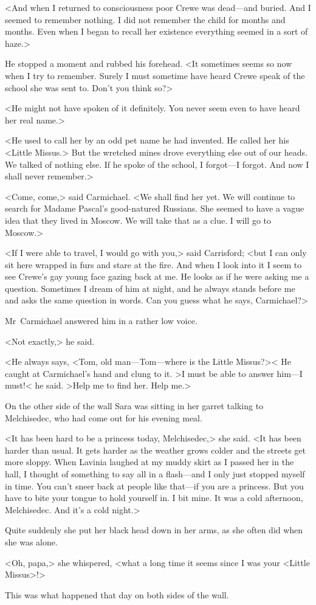 <And when I returned to consciousness poor Crewe was dead—and buried. And I seemed to remember nothing. I did not remember the child for months and months. Even when I began to recall her existence everything seemed in a sort of haze.>

He stopped a moment and rubbed his forehead. <It sometimes seems so now when I try to remember. Surely I must sometime have heard Crewe speak of the school she was sent to. Don't you think so?>

<He might not have spoken of it definitely. You never seem even to have heard her real name.>

<He used to call her by an odd pet name he had invented. He called her his <Little Missus.> But the wretched mines drove everything else out of our heads. We talked of nothing else. If he spoke of the school, I forgot—I forgot. And now I shall never remember.>

<Come, come,> said Carmichael. <We shall find her yet. We will continue to search for Madame Pascal's good-natured Russians. She seemed to have a vague idea that they lived in Moscow. We will take that as a clue. I will go to Moscow.>

<If I were able to travel, I would go with you,> said Carrisford; <but I can only sit here wrapped in furs and stare at the fire. And when I look into it I seem to see Crewe's gay young face gazing back at me. He looks as if he were asking me a question. Sometimes I dream of him at night, and he always stands before me and asks the same question in words. Can you guess what he says, Carmichael?>

Mr~Carmichael answered him in a rather low voice.

<Not exactly,> he said.

<He always says, <Tom, old man—Tom—where is the Little Missus?>< He caught at Carmichael's hand and clung to it. >I must be able to answer him—I must!< he said. >Help me to find her. Help me.>


On the other side of the wall Sara was sitting in her garret talking to Melchisedec, who had come out for his evening meal.

<It has been hard to be a princess today, Melchisedec,> she said. <It has been harder than usual. It gets harder as the weather grows colder and the streets get more sloppy. When Lavinia laughed at my muddy skirt as I passed her in the hall, I thought of something to say all in a flash—and I only just stopped myself in time. You can't sneer back at people like that—if you are a princess. But you have to bite your tongue to hold yourself in. I bit mine. It was a cold afternoon, Melchisedec. And it's a cold night.>

Quite suddenly she put her black head down in her arms, as she often did when she was alone.

<Oh, papa,> she whispered, <what a long time it seems since I was your <Little Missus>!>

This was what happened that day on both sides of the wall.